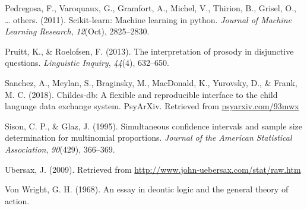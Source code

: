 \documentclass[floatsintext,man]{apa6}
\theoremstyle{definition}
\theoremstyle{definition}
\theoremstyle{definition}
\theoremstyle{remark}
\begin{document}
\hypertarget{ref-pedregosa2011scikit}{}
Pedregosa, F., Varoquaux, G., Gramfort, A., Michel, V., Thirion, B.,
Grisel, O., \ldots{} others. (2011). Scikit-learn: Machine learning in
python. \emph{Journal of Machine Learning Research}, \emph{12}(Oct),
2825--2830.

\hypertarget{ref-pruitt2013interpretation}{}
Pruitt, K., \& Roelofsen, F. (2013). The interpretation of prosody in
disjunctive questions. \emph{Linguistic Inquiry}, \emph{44}(4),
632--650.

\hypertarget{ref-sanchez2018childes}{}
Sanchez, A., Meylan, S., Braginsky, M., MacDonald, K., Yurovsky, D., \&
Frank, M. C. (2018). Childes-db: A flexible and reproducible interface
to the child language data exchange system. PsyArXiv. Retrieved from
\url{psyarxiv.com/93mwx}

\hypertarget{ref-sison1995simultaneous}{}
Sison, C. P., \& Glaz, J. (1995). Simultaneous confidence intervals and
sample size determination for multinomial proportions. \emph{Journal of
the American Statistical Association}, \emph{90}(429), 366--369.

\hypertarget{ref-ubersax2009}{}
Ubersax, J. (2009). Retrieved from
\url{http://www.john-uebersax.com/stat/raw.htm}

\hypertarget{ref-von1968essay}{}
Von Wright, G. H. (1968). An essay in deontic logic and the general
theory of action.
\end{document}
